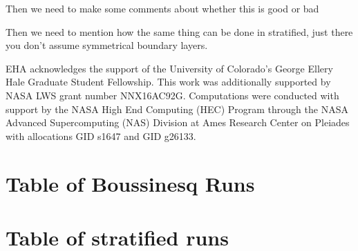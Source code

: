 \documentclass[aps, pre, onecolumn, nofootinbib, notitlepage, groupedaddress, amsfonts, amssymb, amsmath, longbibliography]{revtex4-1}
\begin{document}
Then we need to make some comments about whether this is good or bad

Then we need to mention how the same thing can be done in stratified, just there you don't
assume symmetrical boundary layers.





\begin{acknowledgments}
EHA acknowledges the support of the University of Colorado's George 
Ellery Hale Graduate Student Fellowship.
This work was additionally supported by  NASA LWS grant number NNX16AC92G.  
Computations were conducted 
with support by the NASA High End Computing (HEC) Program through the NASA 
Advanced Supercomputing (NAS) Division at Ames Research Center on Pleiades
with allocations GID s1647 and GID g26133.
\end{acknowledgments}


\appendix
\section{Table of Boussinesq Runs}



\section{Table of stratified runs}



\end{document}
